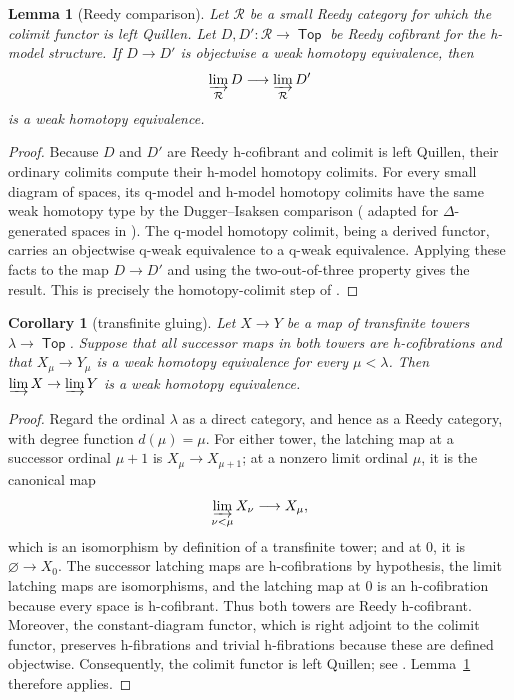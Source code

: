 \documentclass[12pt,a4paper]{amsart}
\newcommand{\Top}{\mathop{\mathsf{Top}}}
\newcommand{\liminj}{\varinjlim}
\newtheorem{lem}[thm]{Lemma}
\newtheorem{cor}[thm]{Corollary}
\theoremstyle{definition}
\begin{document}
\begin{lem}[Reedy comparison]\label{lem:Reedy-comparison}
Let \(\mathcal R\) be a small Reedy category for which the colimit functor is left Quillen.  Let \(D,D':\mathcal R\to\Top\) be Reedy cofibrant for the h-model structure.  If \(D\to D'\) is objectwise a weak homotopy equivalence, then
\[
 \liminj_{\mathcal R}D\longrightarrow\liminj_{\mathcal R}D'
\]
is a weak homotopy equivalence.
\end{lem}

\begin{proof}
Because \(D\) and \(D'\) are Reedy h-cofibrant and colimit is left Quillen, their ordinary colimits compute their h-model homotopy colimits.  For every small diagram of spaces, its q-model and h-model homotopy colimits have the same weak homotopy type by the Dugger--Isaksen comparison (\cite[Theorem~A.7]{hocolimfacile} adapted for \(\Delta\)-generated spaces in \cite[Theorem~2.8]{leftproperflow}). The q-model homotopy colimit, being a derived functor, carries an objectwise q-weak equivalence to a q-weak equivalence.  Applying these facts to the map \(D\to D'\) and using the two-out-of-three property gives the result.  This is precisely the homotopy-colimit step of \cite[proof of Theorem~5.3]{leftproperflow}.
\end{proof}

\begin{cor}[transfinite gluing]\label{cor:transfinite-gluing}
Let \(X\to Y\) be a map of transfinite towers \(\lambda\to\Top\).  Suppose that all successor maps in both towers are h-cofibrations and that \(X_\mu\to Y_\mu\) is a weak homotopy equivalence for every \(\mu<\lambda\). Then \(\liminj X\to\liminj Y\) is a weak homotopy equivalence.
\end{cor}

\begin{proof}
	Regard the ordinal \(\lambda\) as a direct category, and hence as a Reedy category, with degree function \(d(\mu)=\mu\). For either tower, the latching map at a successor ordinal \(\mu+1\) is \(X_\mu\to X_{\mu+1}\); at a nonzero limit ordinal \(\mu\), it is the canonical map
	\[
	\liminj_{\nu<\mu}X_\nu\longrightarrow X_\mu,
	\]
	which is an isomorphism by definition of a transfinite tower; and at \(0\), it is \(\varnothing\to X_0\). The successor latching maps are h-cofibrations by hypothesis, the limit latching maps are isomorphisms, and the latching map at \(0\) is an h-cofibration because every space is h-cofibrant. Thus both towers are Reedy h-cofibrant. Moreover, the constant-diagram functor, which is right adjoint to the colimit functor, preserves h-fibrations and trivial h-fibrations because these are defined objectwise. Consequently, the colimit functor is left Quillen; see \cite[Definition~5.1.1 and Corollary~5.1.6]{MR99h:55031}. Lemma~\ref{lem:Reedy-comparison} therefore applies.
\end{proof}
\end{document}
